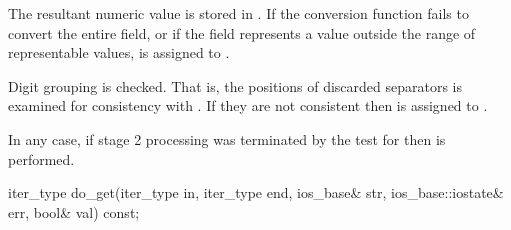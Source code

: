 \begin{itemdescr}
\begin{description}
The resultant numeric value is stored in .
If the conversion function fails to convert the entire field, or
if the field represents a value outside the range of representable values,
 is assigned to .

\end{description}

\pnum
Digit grouping is checked.
That is, the positions of discarded
separators is examined for consistency with
.
If they are not consistent then
is assigned to .

\pnum
In any case, if stage 2 processing was terminated by the test for
then
is performed.
\end{itemdescr}

%
\begin{itemdecl}
iter_type do_get(iter_type in, iter_type end, ios_base& str,
                 ios_base::iostate& err, bool& val) const;
\end{itemdecl}

